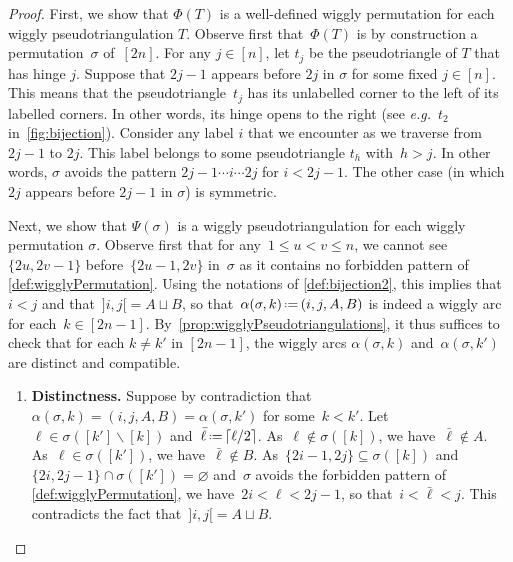 \documentclass{amsart}
\theoremstyle{definition}
\newcommand{\ssm}{\smallsetminus} %
\newcommand{\eqdef}{\mbox{\,\raisebox{0.2ex}{\scriptsize\ensuremath{\mathrm:}}\ensuremath{=}\,}} %
\newcommand{\eg}{\textit{e.g.}~} %
\begin{document}
\begin{proof}
First, we show that \(\Phi(T)\) is a well-defined wiggly permutation for each wiggly pseudotriangulation \(T\).
Observe first that~\(\Phi(T)\) is by construction a permutation~$\sigma$ of~$[2n]$.
For any \(j \in [n]\), let \(t_j\) be the pseudotriangle of \(T\) that has hinge \(j\).
Suppose that \(2j-1\) appears before \(2j\) in \(\sigma\) for some fixed \(j \in [n]\).
This means that the pseudotriangle~\(t_j\) has its unlabelled corner to the left of its labelled corners.
In other words, its hinge opens to the right (see \eg $t_2$ in~\cref{fig:bijection}).
Consider any label \(i\) that we encounter as we traverse from \(2j-1\) to \(2j\).
This label belongs to some pseudotriangle \(t_h\) with~$h > j$.
In other words, \(\sigma\) avoids the pattern \(2j-1 \cdots i \cdots 2j\) for \(i < 2j-1\).
The other case (in which \(2j\) appears before \(2j-1\) in \(\sigma\)) is symmetric.

Next, we show that \(\Psi(\sigma)\) is a wiggly pseudotriangulation for each wiggly permutation \(\sigma\).
Observe first that for any~$1 \le u < v \le n$, we cannot see~$\{2u, 2v-1\}$ before~$\{2u-1, 2v\}$ in~$\sigma$ as it contains no forbidden pattern of \cref{def:wigglyPermutation}.
Using the notations of \cref{def:bijection2}, this implies that~$i < j$ and that~${]i,j[} = A \sqcup B$, so that~$\alpha(\sigma,k) \eqdef (i, j, A, B)$ is indeed a wiggly arc for each~$k \in [2n-1]$.
By~\cref{prop:wigglyPseudotriangulations}, it thus suffices to check that for each \(k \neq k'\) in \([2n-1]\), the wiggly arcs 
\(\alpha(\sigma,k)\) and~\(\alpha(\sigma,k')\) are distinct and compatible.
\begin{enumerate}
\item \textbf{Distinctness.}
Suppose by contradiction that \(\alpha(\sigma,k) = (i,j,A,B) = \alpha(\sigma,k')\) for some~\({k < k'}\).
Let~${\ell \in \sigma([k'] \ssm [k])}$ and~$\bar\ell \eqdef \lceil \ell/2 \rceil$.
As~$\ell \notin \sigma([k])$, we have~$\bar\ell \notin A$.
As~$\ell \in \sigma([k'])$, we have~$\bar\ell \notin B$.
As~$\{2i-1, 2j\} \subseteq \sigma([k])$ and~$\{2i, 2j-1\} \cap \sigma([k']) = \varnothing$ and~$\sigma$ avoids the forbidden pattern of \cref{def:wigglyPermutation}, we have~$2i < \ell < 2j-1$, so that~$i < \bar\ell < j$.
This contradicts the fact that~${]i,j[} = A \sqcup B$.


\end{enumerate}
\end{proof}
\end{document}
